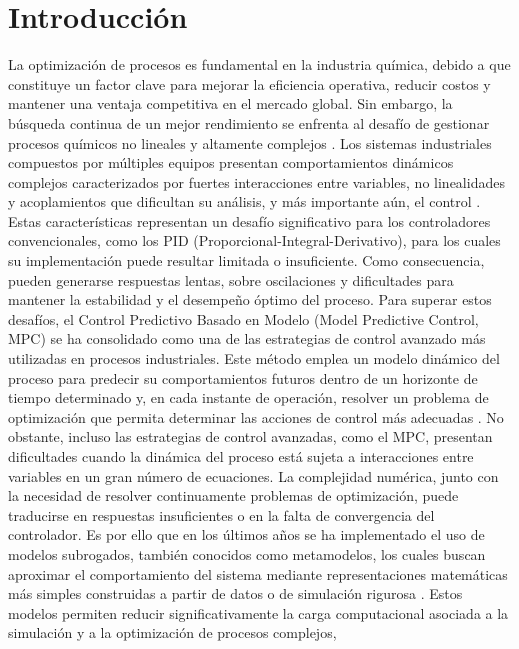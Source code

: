 \section{Introducción}

La optimización de procesos es fundamental en la industria química, 
debido a que constituye un factor clave para mejorar la eficiencia operativa, 
reducir costos y mantener una ventaja competitiva en el mercado global. 
Sin embargo, la búsqueda continua de un mejor rendimiento se enfrenta al desafío 
de gestionar procesos químicos no lineales y altamente complejos \cite{ref1, ref2}. 
Los sistemas industriales compuestos por múltiples equipos presentan comportamientos 
dinámicos complejos caracterizados por fuertes interacciones entre variables, 
no linealidades y acoplamientos que dificultan su análisis, y más importante aún, el control \cite{ref3, ref4}. 
Estas características representan un desafío significativo para los controladores convencionales, como los PID (Proporcional-Integral-Derivativo), 
para los cuales su implementación puede resultar limitada o insuficiente. Como consecuencia, pueden generarse respuestas lentas, sobre oscilaciones y 
dificultades para mantener la estabilidad y el desempeño óptimo del proceso. Para superar estos desafíos, 
el Control Predictivo Basado en Modelo (Model Predictive Control, MPC) se ha consolidado 
como una de las estrategias de control avanzado más utilizadas en procesos industriales. 
Este método emplea un modelo dinámico del proceso para predecir su comportamientos futuros 
dentro de un horizonte de tiempo determinado y, en cada instante de operación, resolver un 
problema de optimización que permita determinar las acciones de control más adecuadas \cite{ref5}. 
No obstante, incluso las estrategias de control avanzadas, como el MPC, presentan dificultades cuando 
la dinámica del proceso está sujeta a interacciones entre variables en un gran número de ecuaciones. 
La complejidad numérica, junto con la necesidad de resolver continuamente problemas de optimización, 
puede traducirse en respuestas insuficientes o en la falta de convergencia del controlador. 
Es por ello que en los últimos años se ha implementado el uso de modelos subrogados, 
también conocidos como metamodelos, los cuales buscan aproximar el comportamiento del sistema 
mediante representaciones matemáticas más simples construidas a partir de 
datos o de simulación rigurosa \cite{ref6, ref7}. Estos modelos permiten reducir 
significativamente la carga computacional asociada a la simulación y a la optimización de procesos complejos, 
